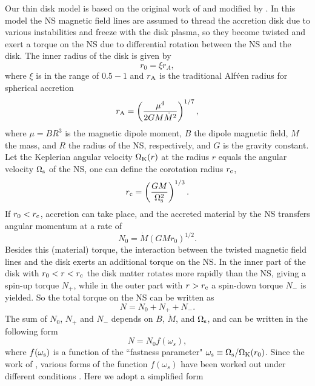 \documentclass[12pt,preprint]{aastex}
\begin{document}
Our thin disk model is based on the original work of \cite{gl1979} and modified by \citet{w1987, w1995}. In this model the NS magnetic field lines are assumed to thread the accretion disk due to various instabilities and freeze with the disk plasma, so they become twisted and exert a torque on the NS due to differential rotation between the NS and the disk. The inner radius of the disk is given by
\begin{equation}
r_0=\xi r_A,
\end{equation}
where $\xi$ is in the range of $0.5-1$ and $r_{\rm A}$ is the traditional Alf\'ven radius for spherical accretion
\begin{equation}
r_{\rm A}=\left(\frac{\mu^4}{2GM\dot{M}^2}\right)^{1/7},
\end{equation}
where $\mu=BR^3$ is the magnetic dipole moment, $B$ the dipole magnetic field, $M$ the mass, and $R$ the radius of the NS, respectively, and $G$ is the gravity constant. Let the Keplerian angular velocity $\Omega_{\rm K}(r)$ at the radius $r$ equals the angular velocity $\Omega_{\rm s}$ of the NS, one can define the corotation radius $r_{\rm c}$,
\begin{equation}
r_{\rm c}=\left(\frac{GM}{\Omega_{\rm s}^2}\right)^{1/3}.
\end{equation}
If $r_0<r_{\rm c}$, accretion can take place, and the accreted material by the NS transfers angular momentum at a rate of
\begin{equation}
N_0=\dot{M}(GMr_0)^{1/2}.
\end{equation}
Besides this (material) torque, the interaction between the twisted magnetic field lines and the disk exerts an additional torque on the NS. In the inner part of the disk with $r_0<r<r_{\rm c}$ the disk matter rotates more rapidly than the NS, giving a spin-up torque $N_{+}$, while in the outer part with $r>r_{\rm c}$ a spin-down torque $N_{-}$ is yielded. So the total torque on the NS can be written as
\begin{equation}
N=N_0+N_{+}+N_{-}.
\end{equation}
The sum of $N_0$, $N_{+}$ and $N_{-}$ depends on $B$, $\dot{M}$, and $\Omega_{\rm s}$, and can be written in the following form
\begin{equation}
N=N_0f(\omega_s),
\end{equation}
where $f(\omega_{\rm s})$ is a function of  the ``fastness parameter" $\omega_{\rm s}\equiv\Omega_{\rm s}/\Omega_{\rm K}(r_0)$. Since the work of \citet{gl1979}, various forms of the function $f(\omega_s)$ have been worked out under different conditions \citep[e.g.,][]{w1987,w1995,c1997,mp2005,dl2006,kr2007,ds2010}. Here we adopt a simplified form
\end{document}
